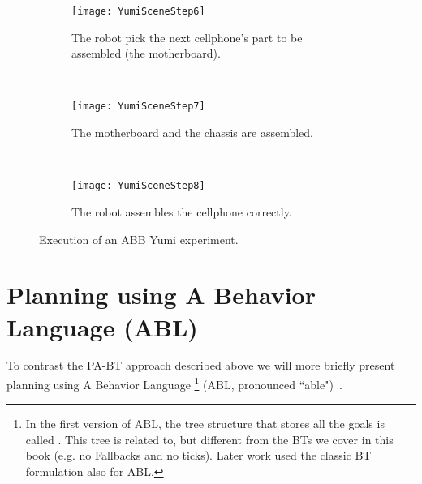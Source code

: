 \begin{figure}[h]
              \begin{subfigure}[b]{1\columnwidth}
                \centering
                \texttt{[image: YumiSceneStep6]}
                \caption{The robot pick the next cellphone's part to be assembled (the motherboard). }
                 \label{planning:SI.fig.Yumistep6}  
        \end{subfigure} 
        ~
        
        \centering
              \begin{subfigure}[b]{1\columnwidth}
                \centering
                \texttt{[image: YumiSceneStep7]}
                \caption{The motherboard and the chassis are assembled.}
                 \label{planning:SI.fig.Yumistep7}  
        \end{subfigure}      
        ~   
              \begin{subfigure}[b]{1\columnwidth}
                \centering
                \texttt{[image: YumiSceneStep8]}
                \caption{The robot assembles the cellphone correctly. }
                 \label{planning:SI.fig.Yumistep8}  
        \end{subfigure}        
        \caption{Execution of an ABB Yumi experiment.}
        \label{planning:SI.fig.yumiscreen2bis}
\end{figure}
\clearpage





\section{Planning using A Behavior Language (ABL)}
\label{planning.MS}

To contrast the PA-BT approach described above we will more briefly present planning using A Behavior Language
\footnote{In the first version of ABL, the tree structure that stores all the goals is called . This tree 
is related to, but different from the BTs we cover in this book (e.g. no Fallbacks and no ticks).
  Later work used the classic BT formulation also for ABL.}
 (ABL, pronounced ``able")~\cite{weber2010reactive,weber2011building}. 

